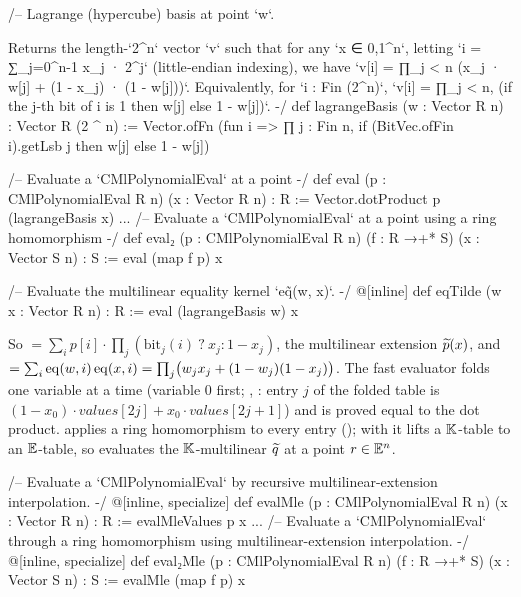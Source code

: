 \begin{leancode}
/-- Lagrange (hypercube) basis at point `w`.

Returns the length-`2^n` vector `v` such that for any `x ∈ {0,1}^n`, letting
`i = ∑_{j=0}^{n-1} x_j · 2^j` (little‑endian indexing), we have
`v[i] = ∏_{j < n} (x_j · w[j] + (1 - x_j) · (1 - w[j]))`.
Equivalently, for `i : Fin (2^n)`,
`v[i] = ∏_{j < n}, (if the j-th bit of i is 1 then w[j] else 1 - w[j])`.
-/
def lagrangeBasis (w : Vector R n) : Vector R (2 ^ n) :=
  Vector.ofFn (fun i => ∏ j : Fin n, if (BitVec.ofFin i).getLsb j then w[j] else 1 - w[j])
\end{leancode}



\begin{leancode}
/-- Evaluate a `CMlPolynomialEval` at a point -/
def eval (p : CMlPolynomialEval R n) (x : Vector R n) : R :=
  Vector.dotProduct p (lagrangeBasis x)
...
/-- Evaluate a `CMlPolynomialEval` at a point using a ring homomorphism -/
def eval₂ (p : CMlPolynomialEval R n) (f : R →+* S) (x : Vector S n) : S := eval (map f p) x

/-- Evaluate the multilinear equality kernel `eq̃(w, x)`. -/
@[inline] def eqTilde (w x : Vector R n) : R :=
  eval (lagrangeBasis w) x
\end{leancode}


So  $= \sum_i p[i] \cdot \prod_j (\mathrm{bit}_j(i)\ ?\ x_j : 1 - x_j)$, the
multilinear extension $\widetilde{p}(x)$, and 
$= \sum_i \mathrm{eq}(w,i)\,\mathrm{eq}(x,i) = \prod_j \bigl(w_j x_j + (1-w_j)(1-x_j)\bigr)$. The fast evaluator
folds one variable at a time (variable 0 first; , : entry $j$ of
the folded table is $(1 - x_0)\cdot\mathit{values}[2j] + x_0\cdot\mathit{values}[2j+1]$) and is
proved equal to the dot product.  applies a ring homomorphism  to
every entry (); with  it lifts a $\mathbb{K}$-table to an
$\mathbb{E}$-table, so  evaluates the $\mathbb{K}$-multilinear $\widetilde{q}$ at
a point $r \in \mathbb{E}^n$.

\begin{leancode}
/-- Evaluate a `CMlPolynomialEval` by recursive multilinear-extension interpolation. -/
@[inline, specialize]
def evalMle (p : CMlPolynomialEval R n) (x : Vector R n) : R :=
  evalMleValues p x
...
/-- Evaluate a `CMlPolynomialEval` through a ring homomorphism using multilinear-extension
interpolation. -/
@[inline, specialize]
def eval₂Mle (p : CMlPolynomialEval R n) (f : R →+* S) (x : Vector S n) : S :=
  evalMle (map f p) x
\end{leancode}

